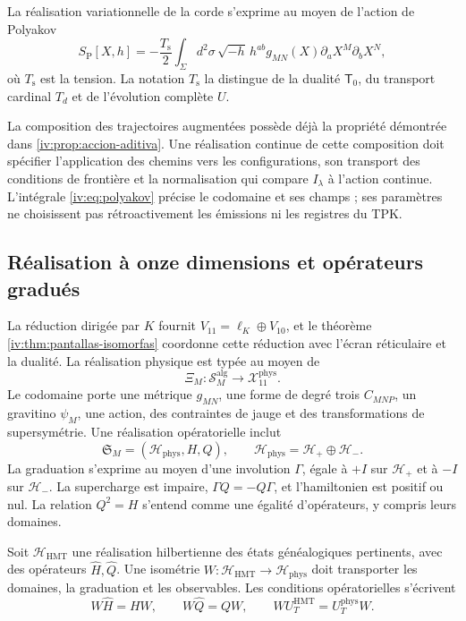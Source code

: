 La réalisation variationnelle de la corde s’exprime au moyen de
l’action de Polyakov
\begin{equation}
 S_{\mathrm P}[X,h]
 =-\frac{T_{\mathrm s}}2\int_\Sigma d^2\sigma\,
 \sqrt{-h}\,h^{ab}g_{MN}(X)
             \partial_aX^M\partial_bX^N,
 \label{iv:eq:polyakov}
\end{equation}
où \(T_{\mathrm s}\) est la tension. La notation
\(T_{\mathrm s}\) la distingue de la dualité
\(\mathsf T_0\), du transport cardinal \(T_d\)
et de l’évolution complète \(U\).

La composition des trajectoires augmentées possède déjà la
propriété démontrée dans \ref{iv:prop:accion-aditiva}.
Une réalisation continue de cette composition doit
spécifier l’application des chemins vers les configurations,
son transport des conditions de frontière et la
normalisation qui compare \(I_\lambda\) à l’action
continue. L’intégrale \eqref{iv:eq:polyakov} précise
le codomaine et ses champs ; ses paramètres ne choisissent pas
rétroactivement les émissions ni les registres du TPK.

\subsection{Réalisation à onze dimensions et opérateurs gradués}

La réduction dirigée par \(K\) fournit
\(V_{11}=\ell_K\oplus V_{10}\), et le théorème
\ref{iv:thm:pantallas-isomorfas} coordonne cette réduction
avec l’écran réticulaire et la dualité. La réalisation
physique est typée au moyen de
\[
 \Xi_M:\mathscr S_M^{\mathrm{alg}}
                  \longrightarrow\mathcal X_{11}^{\mathrm{phys}}.
\]
Le codomaine porte une métrique \(g_{MN}\), une forme de degré trois
\(C_{MNP}\), un gravitino \(\psi_M\), une action,
des contraintes de jauge et des transformations de
supersymétrie. Une réalisation opératorielle inclut
\[
 \mathfrak S_M=(\mathcal H_{\mathrm{phys}},H,Q),\qquad
 \mathcal H_{\mathrm{phys}}=\mathcal H_+\oplus\mathcal H_-.
\]
La graduation s’exprime au moyen d’une involution
\(\Gamma\), égale à \(+I\) sur \(\mathcal H_+\)
et à \(-I\) sur \(\mathcal H_-\). La supercharge
est impaire, \(\Gamma Q=-Q\Gamma\), et
l’hamiltonien est positif ou nul. La relation
\(Q^2=H\) s’entend comme une égalité d’opérateurs,
y compris leurs domaines.


Soit \(\mathcal H_{\mathrm{HMT}}\) une réalisation
hilbertienne des états généalogiques pertinents,
avec des opérateurs \(\widehat H,\widehat Q\). Une
isométrie \(W:\mathcal H_{\mathrm{HMT}}\to
\mathcal H_{\mathrm{phys}}\) doit transporter
les domaines, la graduation et les observables. Les conditions
opératorielles s’écrivent
\begin{equation}
 W\widehat H=HW,\qquad
 W\widehat Q=QW,\qquad
 WU_T^{\mathrm{HMT}}=U_T^{\mathrm{phys}}W.
 \label{iv:eq:entrelazamiento-fisico}
\end{equation}

